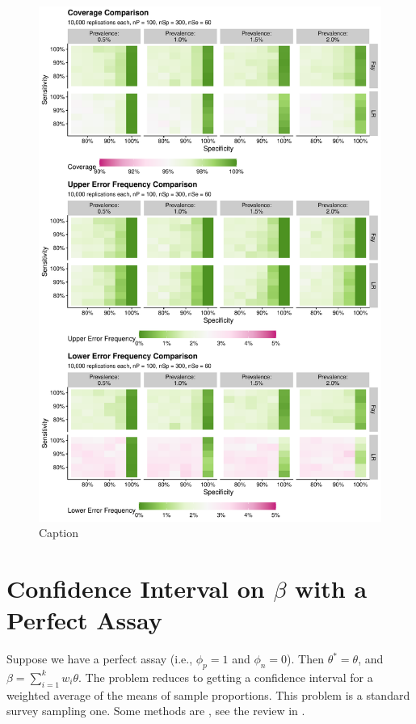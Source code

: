 \documentclass{article}
\begin{document}
\begin{figure}
    \centering
    \includegraphics[width=\textwidth,height=\textheight,keepaspectratio]{Combined_comparison_plots.pdf}
    \caption{Caption}
    \label{fig:Combined_comparison_plots}
\end{figure}

\section{Confidence Interval on $\beta$ with a Perfect Assay}
\label{sec-betaPerfect}


Suppose we have a perfect assay (i.e., $\phi_p=1$ and $\phi_n=0$). Then $\theta^* = \theta$, and $\beta = \sum_{i=1}^{k} w_i \theta$.
The problem reduces to getting a confidence interval for a weighted average of the means of sample proportions.
This problem is a standard survey sampling one. Some methods are \citet{Korn:1998}, see the review in \citet{Dean:2015}.
\end{document}
